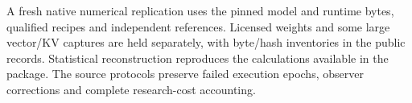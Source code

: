 A fresh native numerical replication uses the pinned model and runtime bytes, qualified recipes and independent references. Licensed weights and some large vector/KV captures are held separately, with byte/hash inventories in the public records. Statistical reconstruction reproduces the calculations available in the package. The source protocols preserve failed execution epochs, observer corrections and complete research-cost accounting.
